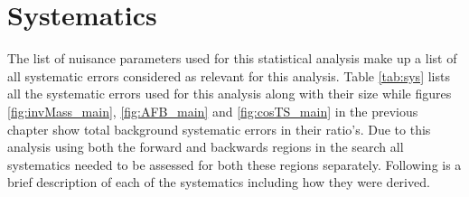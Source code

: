 \section{Systematics}
    \label{sec:sys}

    The list of nuisance parameters used for this statistical analysis make up a list of all systematic errors considered as relevant for this analysis. Table \ref{tab:sys} lists all the systematic errors used for this analysis along with their size while figures \ref{fig:invMass_main}, \ref{fig:AFB_main} and \ref{fig:cosTS_main} in the previous chapter show total background systematic errors in their ratio's. 
    Due to this analysis using both the forward and backwards regions in the search all systematics needed to be assessed for both these regions separately.
    Following is a brief description of each of the systematics including how they were derived.

